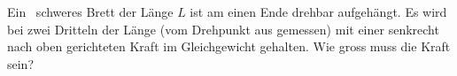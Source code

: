 Ein \mBrO\ schweres Brett der Länge $L$ ist am einen Ende drehbar aufgehängt. Es wird bei zwei Dritteln der Länge (vom Drehpunkt aus gemessen) mit einer senkrecht nach oben gerichteten Kraft im Gleichgewicht gehalten. Wie gross muss die Kraft sein?
